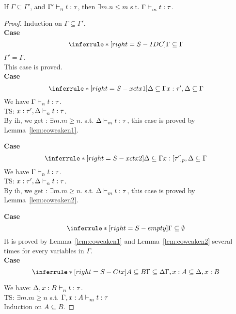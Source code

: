 \documentclass{article}
\begin{document}
\begin{lemma}
	\label{lem:subext}
	If $\Gamma \subseteq \Gamma'$,  and $\Gamma' \mathrel{\vdash_{n}^{} {t} : {\tau}}$, then $\exists m. n \leq m$ s.t.  $\Gamma  \mathrel{\vdash_{m}^{} {t} : {\tau}} $. \\
\end{lemma}
\begin{proof}
  Induction on $\Gamma \subseteq \Gamma'$.\\
    \noindent \textbf{Case} 
    \[
    \inferrule*[right = S-IDC]
  { }
  { \Gamma \subseteq \Gamma }
    \]
   $ \Gamma' = \Gamma $.\\
   This case is proved.\\
   
    \noindent \textbf{Case} 
    \[
     \inferrule*[right = S-xctx1]
  {
  {\Delta \subseteq \Gamma }
  }
  {x:\tau', \Delta \subseteq \Gamma }
    \]
    We have $\Gamma \mathrel{\vdash_{n}^{} {t} : {\tau}}$. \\
    TS: $ x:\tau', \Delta \mathrel{\vdash_{n}^{} {t} : {\tau}}$.
    \\ 
    By ih, we get :  $ \exists m. m \geq n.$ s.t. $\Delta \mathrel{\vdash_{m}^{} {t} : {\tau}}$, this case is proved by Lemma~\ref{lem:coweaken1}.
   
    \noindent \textbf{Case} 
    \[
     \inferrule*[right = S-xctx2]
  {
  {\Delta \subseteq \Gamma }
  }
  {x:[\tau']_p, \Delta \subseteq \Gamma }
    \]
    We have $\Gamma \mathrel{\vdash_{n}^{} {t} : {\tau}}$. \\
    TS: $ x:\tau', \Delta \mathrel{\vdash_{n}^{} {t} : {\tau}}$.
    \\ 
    By ih, we get :  $ \exists m. m \geq n.$ s.t. $\Delta \mathrel{\vdash_{m}^{} {t} : {\tau}}$, this case is proved by Lemma~\ref{lem:coweaken2}.
   
   
    \noindent \textbf{Case}  
    \[
    \inferrule*[right = S-empty]
  { }
  { \Gamma \subseteq \emptyset}
    \]
   It is proved by Lemma~\ref{lem:coweaken1} and Lemma~\ref{lem:coweaken2} several times for every variables in $\Gamma$. \\
   
    \noindent \textbf{Case}  
    \[
  \inferrule*[right = S-Ctx]
  {
  {A \subseteq B  }\\
  {\Gamma \subseteq \Delta}
  }
  {\Gamma, x: A \subseteq \Delta, x: B }
    \]
    
 We have: $\Delta, x:B \mathrel{\vdash_{n}^{} {t} : {\tau}}$.\\
 TS: $\exists m. m \geq n $ s.t. $ \Gamma, x : A \mathrel{\vdash_{m}^{} {t} : {\tau}}  $    \\
Induction on $A \subseteq B$.
    

\end{proof}
\end{document}
